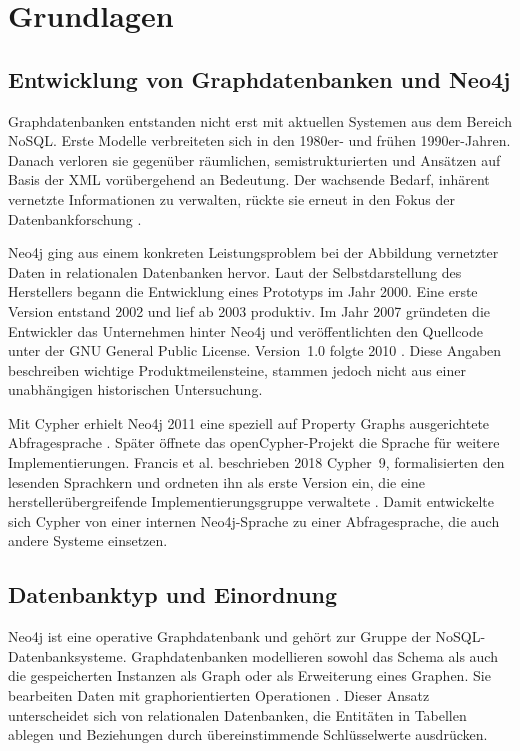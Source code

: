 

\chapter{Grundlagen}

\section{Entwicklung von Graphdatenbanken und Neo4j}

Graphdatenbanken entstanden nicht erst mit aktuellen Systemen aus dem Bereich \ac{NoSQL}. Erste Modelle verbreiteten sich in den 1980er- und frühen 1990er-Jahren. Danach verloren sie gegenüber räumlichen, semistrukturierten und Ansätzen auf Basis der \ac{XML} vorübergehend an Bedeutung. Der wachsende Bedarf, inhärent vernetzte Informationen zu verwalten, rückte sie erneut in den Fokus der Datenbankforschung \cite{angles2008survey}.

Neo4j ging aus einem konkreten Leistungsproblem bei der Abbildung vernetzter Daten in relationalen Datenbanken hervor. Laut der Selbstdarstellung des Herstellers begann die Entwicklung eines Prototyps im Jahr 2000. Eine erste Version entstand 2002 und lief ab 2003 produktiv. Im Jahr 2007 gründeten die Entwickler das Unternehmen hinter Neo4j und veröffentlichten den Quellcode unter der GNU General Public License. Version~1.0 folgte 2010 \cite{neo4j2026company}. Diese Angaben beschreiben wichtige Produktmeilensteine, stammen jedoch nicht aus einer unabhängigen historischen Untersuchung.

Mit Cypher erhielt Neo4j 2011 eine speziell auf Property Graphs ausgerichtete Abfragesprache \cite{neo4j2026cypher}. Später öffnete das openCypher-Projekt die Sprache für weitere Implementierungen. Francis et al. beschrieben 2018 Cypher~9, formalisierten den lesenden Sprachkern und ordneten ihn als erste Version ein, die eine herstellerübergreifende Implementierungsgruppe verwaltete \cite{francis2018cypher}. Damit entwickelte sich Cypher von einer internen Neo4j-Sprache zu einer Abfragesprache, die auch andere Systeme einsetzen.

\section{Datenbanktyp und Einordnung}

Neo4j ist eine operative Graphdatenbank und gehört zur Gruppe der \ac{NoSQL}-Daten\-banksysteme. Graphdatenbanken modellieren sowohl das Schema als auch die gespeicherten Instanzen als Graph oder als Erweiterung eines Graphen. Sie bearbeiten Daten mit graphorientierten Operationen \cite{angles2008survey}. Dieser Ansatz unterscheidet sich von relationalen Datenbanken, die Entitäten in Tabellen ablegen und Beziehungen durch übereinstimmende Schlüsselwerte ausdrücken.

